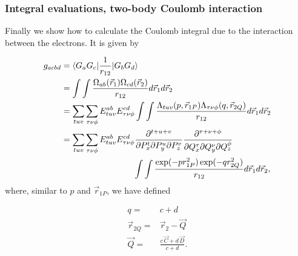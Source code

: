 \documentclass{beamer}
\begin{document}
\begin{frame}
\frametitle{Integral evaluations, two-body Coulomb interaction}

\begin{block}{}

Finally we show how to calculate the Coulomb integral due to the interaction between the electrons. It is given by

\begin{equation}
\begin{split}
  g_{acbd} & = \langle G_a G_c\vert \frac{1}{r_{12}}\vert G_b G_d\rangle \\
           & = \int\int \frac{\Omega_{ab}(\vec r_1)\Omega_{cd}(\vec r_2)}{r_{12}} d\vec r_1 d\vec r_2 \\
           & = \sum_{tuv}\sum_{\tau\nu\phi}E^{ab}_{tuv}E^{cd}_{\tau\nu\phi}\int\int\frac{\Lambda_{tuv}(p,\vec r_{1P})\Lambda_{\tau\nu\phi}(q,\vec r_{2Q})}{r_{12}}d \vec r_1 d\vec r_2 \\
           & = \sum_{tuv}\sum_{\tau\nu\phi}E^{ab}_{tuv}E^{cd}_{\tau\nu\phi}\frac{\partial^{t+u+v}}{\partial P_x^t \partial P_y^u \partial P_z^v}
                \frac{\partial^{\tau+\nu+\phi}}{\partial Q_x^\tau \partial Q_y^\nu \partial Q_z^\phi} \\
           &    \hspace{30mm} \int\int\frac{\exp(-pr^2_{1P})\exp(-qr^2_{2Q})}{r_{12}}d \vec r_1 d\vec r_2,
\end{split}
\end{equation}
where, similar to $p$ and $\vec r_{1P}$, we have defined

\begin{equation}
 \begin{split}
    q = & c + d\\
  \vec r_{2Q} = & \vec r_2 - \vec Q \\
  \vec Q = & \frac{c\,\vec C + d\,\vec D}{c + d}.
 \end{split}
\end{equation}
\end{block}
\end{frame}
\end{document}
